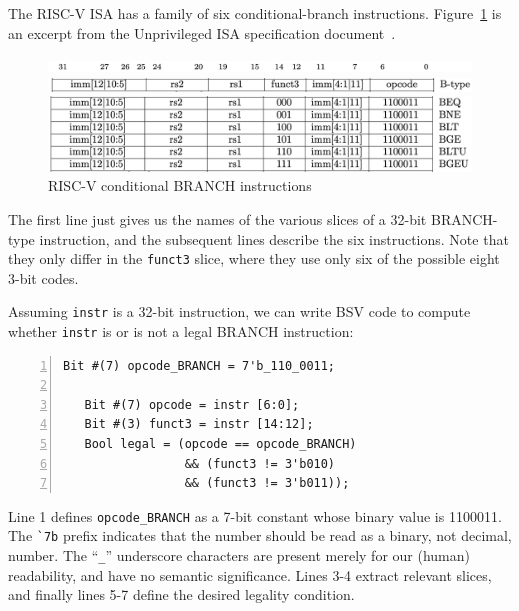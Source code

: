The RISC-V ISA has a family of six conditional-branch instructions.
Figure~\ref{Fig_Combo_BRANCH_instrs} is an excerpt from the Unprivileged ISA
specification document~\cite{RISCV_Unpriv_2019_12_13}.
\begin{figure}[htbp]
  \centerline{\includegraphics[width=6in,angle=0]{ch040_Combo_Circuits/Figures/Fig_Combo_BRANCH_instrs_1}}
  \centerline{\includegraphics[width=6in,angle=0]{ch040_Combo_Circuits/Figures/Fig_Combo_BRANCH_instrs_2}}
  \vspace{2mm}
  \centerline{\includegraphics[width=6in,angle=0]{ch040_Combo_Circuits/Figures/Fig_Combo_BRANCH_instrs_3}}
  \caption{\label{Fig_Combo_BRANCH_instrs}RISC-V conditional BRANCH instructions}
\end{figure}
The first line just gives us the names of the various slices of a
32-bit BRANCH-type instruction, and the subsequent lines describe the
six instructions.  Note that they only differ in the \verb|funct3|
slice, where they use only six of the possible eight 3-bit codes.

Assuming \verb|instr| is a 32-bit instruction, we can write BSV code
to compute whether \verb|instr| is or is not a legal BRANCH
instruction:

\begin{Verbatim}[frame=single, numbers=left]
   Bit #(7) opcode_BRANCH = 7'b_110_0011;

   Bit #(7) opcode = instr [6:0];
   Bit #(3) funct3 = instr [14:12];
   Bool legal = (opcode == opcode_BRANCH)
                 && (funct3 != 3'b010)
                 && (funct3 != 3'b011));
\end{Verbatim}

Line 1 defines \verb|opcode_BRANCH| as a 7-bit constant whose binary
value is 1100011.  The \verb|`7b| prefix indicates that the number
should be read as a binary, not decimal, number.  The ``\verb|_|''
underscore characters are present merely for our (human) readability,
and have no semantic significance.  Lines 3-4 extract relevant slices,
and finally lines 5-7 define the desired legality condition.


